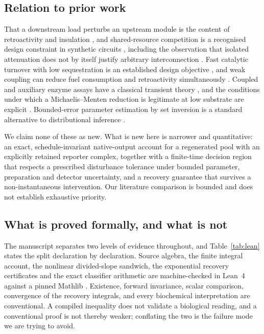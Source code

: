\documentclass[11pt]{article}
\theoremstyle{definition}
\theoremstyle{remark}
\begin{document}
\subsection{Relation to prior work}

That a downstream load perturbs an upstream module is the content of
retroactivity and insulation \citep{delvecchio2008}, and shared-resource
competition is a recognised design constraint in synthetic circuits
\citep{qian2017}, including the observation that isolated attenuation does not
by itself justify arbitrary interconnection \citep{qian2020}. Fast catalytic
turnover with low sequestration is an established design objective
\citep{deshpande2020}, and weak coupling can reduce fuel consumption and
retroactivity simultaneously \citep{deshpande2017}. Coupled and auxiliary
enzyme assays have a classical transient theory \citep{easterby1973,
eilertsen2018}, and the conditions under which a Michaelis--Menten reduction is
legitimate at low substrate are explicit \citep{segel1989, low2024}. Bounded-error
parameter estimation by set inversion is a standard alternative to
distributional inference \citep{jaulin1993}.

We claim none of these as new. What is new here is narrower and quantitative:
an exact, schedule-invariant native-output account for a regenerated pool with
an explicitly retained reporter complex, together with a finite-time decision
region that respects a prescribed disturbance tolerance under bounded parameter,
preparation and detector uncertainty, and a recovery guarantee that survives a
non-instantaneous intervention. Our literature comparison is bounded and does
not establish exhaustive priority.

\subsection{What is proved formally, and what is not}

The manuscript separates two levels of evidence throughout, and
Table~\ref{tab:lean} states the split declaration by declaration. Source
algebra, the finite integral account, the nonlinear divided-slope sandwich, the
exponential recovery certificates and the exact classifier arithmetic are
machine-checked in Lean~4 against a pinned Mathlib \citep{lean4, mathlib2020}.
Existence, forward invariance, scalar comparison, convergence of the recovery
integrals, and every biochemical interpretation are conventional. A compiled
inequality does not validate a biological reading, and a conventional proof is
not thereby weaker; conflating the two is the failure mode we are trying to
avoid.
\end{document}
